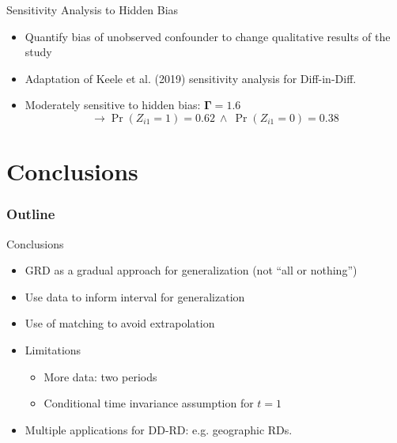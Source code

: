 \documentclass[usenames,dvipsnames,11pt,aspectratio=169]{beamer}
\begin{document}
\begin{frame}{Sensitivity Analysis to Hidden Bias}
\begin{itemize}
    \item Quantify bias of unobserved confounder to change qualitative results of the study
        \vspace{0.1cm}
    \item Adaptation of Keele et al. (2019) sensitivity analysis for Diff-in-Diff.
        \vspace{0.1cm}
    \item Moderately sensitive to hidden bias: $\boldsymbol{\Gamma} \mathbf{=} \mathbf{1.6}$
    $$ \rightarrow \Pr(Z_{i1}=1)=0.62 \ \wedge \ \Pr(Z_{i1}=0)=0.38$$
\end{itemize}
\end{frame}

\section{Conclusions}

\begin{frame}
\frametitle{Outline}
\tableofcontents[currentsection]
\end{frame}

\begin{frame}{Conclusions}

\begin{itemize}
\item GRD as a gradual approach for generalization (not ``all or nothing'')
    \vspace{0.1cm}
\item Use data to inform interval for generalization
\vspace{0.1cm}
\item Use of matching to avoid extrapolation
\vspace{0.1cm}
\item Limitations
\begin{itemize}
\item More data: two periods
\item Conditional time invariance assumption for $t=1$
\end{itemize}
\vspace{0.1cm}
\item Multiple applications for DD-RD: e.g. geographic RDs.
\end{itemize}
\end{frame}

\maketitle
\end{document}
